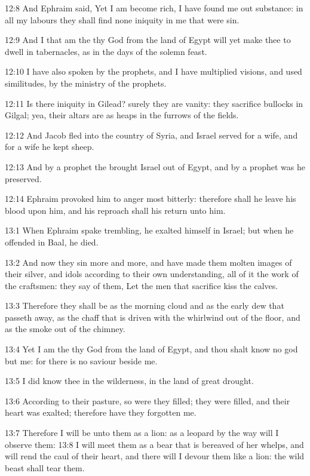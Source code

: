 12:8 And Ephraim said, Yet I am become rich, I have found me out
substance: in all my labours they shall find none iniquity in me that
were sin.

12:9 And I that am the \LORD thy God from the land of Egypt will yet
make thee to dwell in tabernacles, as in the days of the solemn feast.

12:10 I have also spoken by the prophets, and I have multiplied
visions, and used similitudes, by the ministry of the prophets.

12:11 Is there iniquity in Gilead? surely they are vanity: they
sacrifice bullocks in Gilgal; yea, their altars are as heaps in the
furrows of the fields.

12:12 And Jacob fled into the country of Syria, and Israel served for
a wife, and for a wife he kept sheep.

12:13 And by a prophet the \LORD brought Israel out of Egypt, and by a
prophet was he preserved.

12:14 Ephraim provoked him to anger most bitterly: therefore shall he
leave his blood upon him, and his reproach shall his \LORD return unto
him.

13:1 When Ephraim spake trembling, he exalted himself in Israel; but
when he offended in Baal, he died.

13:2 And now they sin more and more, and have made them molten images
of their silver, and idols according to their own understanding, all
of it the work of the craftsmen: they say of them, Let the men that
sacrifice kiss the calves.

13:3 Therefore they shall be as the morning cloud and as the early dew
that passeth away, as the chaff that is driven with the whirlwind out
of the floor, and as the smoke out of the chimney.

13:4 Yet I am the \LORD thy God from the land of Egypt, and thou shalt
know no god but me: for there is no saviour beside me.

13:5 I did know thee in the wilderness, in the land of great drought.

13:6 According to their pasture, so were they filled; they were
filled, and their heart was exalted; therefore have they forgotten me.

13:7 Therefore I will be unto them as a lion: as a leopard by the way
will I observe them: 13:8 I will meet them as a bear that is bereaved
of her whelps, and will rend the caul of their heart, and there will I
devour them like a lion: the wild beast shall tear them.

